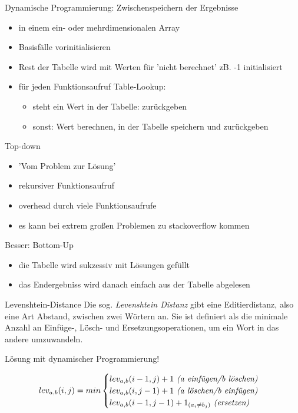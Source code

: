 \begin{frame}{Dynamische Programmierung: Zwischenspeichern der Ergebnisse}
	\begin{itemize}
	\item in einem ein- oder mehrdimensionalen Array 
	\item Basisfälle vorinitialisieren 
	\item Rest der Tabelle wird mit Werten für 'nicht berechnet' zB. -1 initialisiert
	\item für jeden Funktionsaufruf Table-Lookup:
		\begin{itemize}
			\item steht ein Wert in der Tabelle: zurückgeben
			\item sonst: Wert berechnen, in der Tabelle speichern und zurückgeben
		\end{itemize}
	\end{itemize}
\end{frame}

\begin{frame}{Top-down}
	\begin{itemize}
		\item 'Vom Problem zur Lösung'
		\item rekursiver Funktionsaufruf
		\item overhead durch viele Funktionsaufrufe
		\item es kann bei extrem großen Problemen zu stackoverflow kommen
	\end{itemize}
\end{frame}

\begin{frame}{Besser: Bottom-Up}
	\begin{itemize}
		\item die Tabelle wird sukzessiv mit Lösungen gefüllt
		\item das Endergebniss wird danach einfach aus der Tabelle abgelesen
	\end{itemize}
\end{frame}

\begin{frame}{Levenshtein-Distance}
	Die sog. \emph{Levenshtein Distanz} gibt eine Editierdistanz, also eine Art Abstand, zwischen zwei Wörtern an.
	Sie ist definiert als die minimale Anzahl an Einfüge-, Lösch- und Ersetzungsoperationen, um ein Wort in das andere umzuwandeln.

	Lösung mit dynamischer Programmierung!

	$$
	lev_{a,b}(i, j) = min \begin{cases}
		lev_{a,b}(i - 1, j) + 1\ \text{\emph{(a einfügen/b löschen)}}\\
		lev_{a,b}(i, j - 1) + 1\ \text{\emph{(a löschen/b einfügen)}}\\
		lev_{a,b}(i - 1, j - 1) + 1_{(a_i \neq b_j)}\ \text{\emph{(ersetzen)}}\\
	\end{cases}
	$$
\end{frame}

